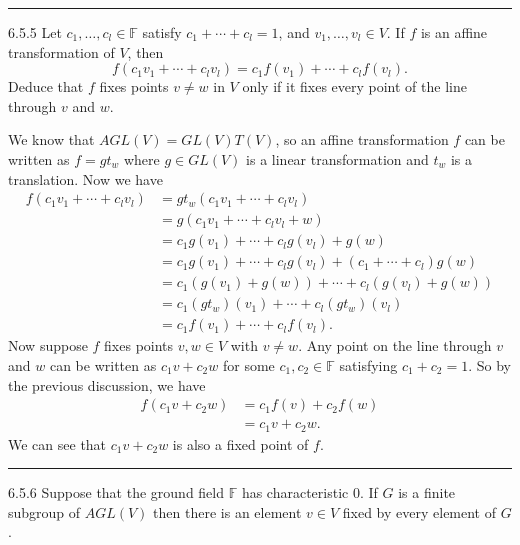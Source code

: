 \documentclass[a4paper, 12pt]{article}
\begin{document}
\noindent\rule{7in}{2.8pt}
\begin{problem}{6.5.5}
Let \(c_1,\ldots,c_l\in \mathbb{F}\) satisfy \(c_1+\cdots+c_l=1\), and \(v_1,\ldots,v_l\in V\). If \(f\) is an affine transformation of \(V\), then 
\[f(c_1v_1+\cdots+c_lv_l)=c_1f(v_1)+\cdots+c_lf(v_l).\]
Deduce that \(f\) fixes points \(v\neq w\) in \(V\) only if it fixes every point of the line through \(v\) and \(w\).
\end{problem}
\begin{solution}
We know that \(AGL(V)=GL(V)T(V)\), so an affine transformation \(f\) can be written as \(f=g t_w\) where \(g\in GL(V)\) is a linear transformation and \(t_w\) is a translation. Now we have 
\begin{align*}
    f(c_1v_1+\cdots+c_lv_l)&=gt_w(c_1v_1+\cdots+c_lv_l)\\ 
                           &=g(c_1v_1+\cdots+c_lv_l+w)\\ 
                           &=c_1g(v_1)+\cdots+c_lg(v_l)+g(w)\\ 
                           &=c_1g(v_1)+\cdots+c_lg(v_l)+(c_1+\cdots+c_l)g(w)\\ 
                           &=c_1(g(v_1)+g(w))+\cdots+c_l(g(v_l)+g(w))\\ 
                           &=c_1(gt_w)(v_1)+\cdots+c_l(gt_w)(v_l)\\ 
                           &=c_1f(v_1)+\cdots+c_lf(v_l).
\end{align*}
Now suppose \(f\) fixes points \(v,w\in V\) with \(v\neq w\). Any point on the line through \(v\) and \(w\) can be written as \(c_1v+c_2w\) for some \(c_1,c_2\in \mathbb{F}\) satisfying \(c_1+c_2=1\). So by the 
previous discussion, we have 
\begin{align*}
    f(c_1v+c_2w)&=c_1f(v)+c_2f(w)\\ 
                &=c_1v+c_2w.
\end{align*}
We can see that \(c_1v+c_2w\) is also a fixed point of \(f\).
\end{solution}

\noindent\rule{7in}{2.8pt}
\begin{problem}{6.5.6}
Suppose that the ground field \(\mathbb{F}\) has characteristic \(0\). If \(G\) is a finite subgroup of \(AGL(V)\) then there is an element \(v\in V\) fixed by every element of \(G\).
\end{problem}
\begin{solution}
    
\end{solution}
\end{document}
